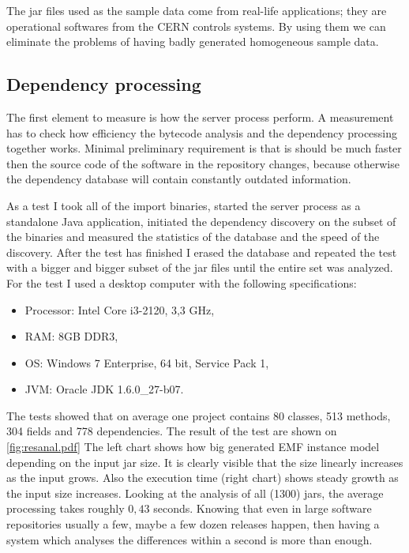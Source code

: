 The jar files used as the sample data come from real-life applications; they are
operational softwares from the CERN controls systems. By using them we can
eliminate the problems of having badly generated homogeneous sample data.

\subsection{Dependency processing}
\label{sect:depproc}
The first element to measure is how the server process perform.
A measurement has to check how efficiency the bytecode analysis and the
dependency processing together works. Minimal preliminary requirement is that is
should be much faster then the source code of the software in  the repository
changes, because otherwise the dependency database will contain constantly
outdated information.

As a test I took all of the import binaries, started the server process as a
standalone Java application, initiated the dependency discovery on the subset of
the binaries and measured the statistics of the database and the speed of the
discovery. After the test has finished I erased the database and repeated the
test with a bigger and bigger subset of the jar files until the entire set was
analyzed. For the test I used a desktop computer with the following
specifications:
\begin{itemize}
  \item Processor: Intel Core i3-2120, 3,3 GHz,
  \item RAM: 8GB DDR3,
  \item OS: Windows 7 Enterprise, 64 bit, Service Pack 1,
  \item JVM: Oracle JDK 1.6.0\_27-b07.
\end{itemize}
The tests showed that on average one project contains 80 classes, 513 methods, 304 fields and 778 dependencies. 
The result of the test are shown on \autoref{fig:resanal.pdf}
The left chart shows how big generated EMF instance model depending on the
input jar size. It is clearly visible that the size linearly increases
as the input grows. Also the execution time (right chart) shows 
steady growth as the input size increases. Looking at the analysis
 of all (1300) jars, the average processing takes roughly $0,43$ seconds.
Knowing that even in large software repositories usually a few, maybe a few 
dozen releases happen, then having a system which analyses the differences within
a second is more than enough.

